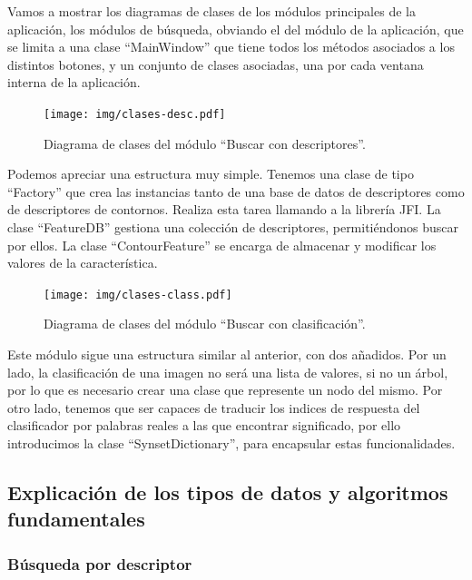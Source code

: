 Vamos a mostrar los diagramas de clases de los módulos principales de la aplicación, los módulos de búsqueda, obviando el del módulo de la aplicación, que se limita a una clase ``MainWindow'' que tiene todos los métodos asociados a los distintos botones, y un conjunto de clases asociadas, una por cada ventana interna de la aplicación.

\begin{figure}[H]
\begin{center}

\texttt{[image: img/clases-desc.pdf]}
\end{center}

\caption{Diagrama de clases del módulo ``Buscar con descriptores''.}
\end{figure}

Podemos apreciar una estructura muy simple. Tenemos una clase de tipo ``Factory'' que crea las instancias tanto de una base de datos de descriptores como de descriptores de contornos. Realiza esta tarea llamando a la librería JFI. La clase ``FeatureDB'' gestiona una colección de descriptores, permitiéndonos buscar por ellos. La clase ``ContourFeature'' se encarga de almacenar y modificar los valores de la característica.\\

\begin{figure}[H]
\begin{center}

\texttt{[image: img/clases-class.pdf]}
\end{center}

\caption{Diagrama de clases del módulo ``Buscar con clasificación''.}
\end{figure}

Este módulo sigue una estructura similar al anterior, con dos añadidos. Por un lado, la clasificación de una imagen no será una lista de valores, si no un árbol, por lo que es necesario crear una clase que represente un nodo del mismo. Por otro lado, tenemos que ser capaces de traducir los indices de respuesta del clasificador por palabras reales a las que encontrar significado, por ello introducimos la clase ``SynsetDictionary'', para encapsular estas funcionalidades.
\subsection{Explicación de los tipos de datos y algoritmos fundamentales}

\subsubsection{Búsqueda por descriptor}


